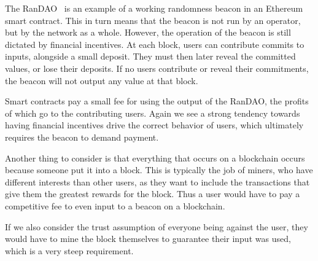 The RanDAO~\cite{randao} is an example of a working randomness beacon in an Ethereum smart contract. This in turn means that the beacon is not run by an operator, but by the network as a whole. However, the operation of the beacon is still dictated by financial incentives. At each block, users can contribute commits to inputs, alongside a small deposit. They must then later reveal the committed values, or lose their deposits. If no users contribute or reveal their commitments, the beacon will not output any value at that block.

Smart contracts pay a small fee for using the output of the RanDAO, the profits of which go to the contributing users. Again we see a strong tendency towards having financial incentives drive the correct behavior of users, which ultimately requires the beacon to demand payment.

Another thing to consider is that everything that occurs on a blockchain occurs because someone put it into a block. This is typically the job of miners, who have different interests than other users, as they want to include the transactions that give them the greatest rewards for the block. Thus a user would have to pay a competitive fee to even input to a beacon on a blockchain.

If we also consider the trust assumption of everyone being against the user, they would have to mine the block themselves to guarantee their input was used, which is a very steep requirement.
